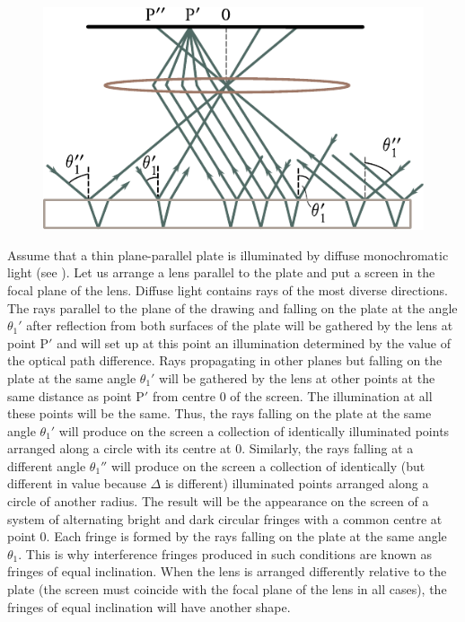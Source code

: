 \begin{figure}[!htb]
	\begin{center}
		\includegraphics[scale=1]{figures/ch_17/fig_17_12.pdf}
		\caption[]{}
		\label{fig:17_12}
	\end{center}
	\vspace{-0.8cm}
\end{figure}

Assume that a thin plane-parallel plate is illuminated by diffuse monochromatic light (see ).
Let us arrange a lens parallel to the plate and put a screen in the focal plane of the lens.
Diffuse light contains rays of the most diverse directions.
The rays parallel to the plane of the drawing and falling on the plate at the angle $\theta_1'$ after reflection from both surfaces of the plate will be gathered by the lens at point P$'$ and will set up at this point an illumination determined by the value of the optical path difference.
Rays propagating in other planes but falling on the plate at the same angle $\theta_1'$
will be gathered by the lens at other points at the same distance as point P$'$ from centre $0$ of the screen.
The illumination at all these points will be the same.
Thus, the rays falling on the plate at the same angle $\theta_1'$ will produce on the screen a collection of identically illuminated points arranged along a circle with its centre at $0$.
Similarly, the rays falling at a different angle $\theta_1''$ will produce on the screen a collection of identically (but different in value because $\Delta$ is different) illuminated points arranged along a circle of another radius.
The result will be the appearance on the screen of a system of alternating bright and dark circular fringes with a common centre at point $0$.
Each fringe is formed by the rays falling on the plate at the same angle $\theta_1$.
This is why interference fringes produced in such conditions are known as fringes of equal inclination.
When the lens is arranged differently relative to the plate (the screen must coincide with the focal plane of the lens in all cases), the fringes of equal inclination will have another shape.

